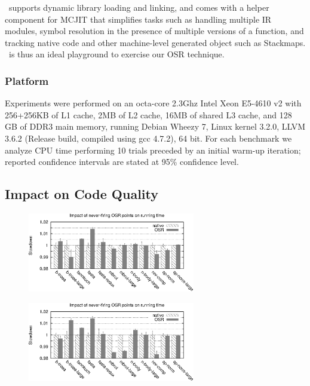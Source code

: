 \tinyvm\ supports dynamic library loading and linking, and comes with a helper component for MCJIT that simplifies tasks such as handling multiple IR modules, symbol resolution in the presence of multiple versions of a function, and tracking native code and other machine-level generated object such as Stackmaps. \tinyvm\ is thus an ideal playground to exercise our OSR technique.

\subsubsection*{Platform}
Experiments were performed on an octa-core 2.3Ghz Intel Xeon E5-4610 v2 with 256+256KB of L1 cache, 2MB of L2 cache, 16MB of shared L3 cache, and 128 GB of DDR3 main memory, running Debian Wheezy 7, Linux kernel 3.2.0, LLVM 3.6.2 (Release build, compiled using gcc 4.7.2), 64 bit. For each benchmark we analyze CPU time performing 10 trials preceded by an initial warm-up iteration; reported confidence intervals are stated at 95\% confidence level.

\subsection{Impact on Code Quality}

\ifdefined\noauthorea
\begin{figure}[!ht]
\begin{center}
\includegraphics[width=0.65\textwidth]{figures/osr-code-quality-base/osr-code-quality-base.eps}
\caption{\protect}
\end{center}
\end{figure}
\fi

\ifdefined\noauthorea
\begin{figure}[ht]
\begin{center}
\includegraphics[width=0.65\textwidth]{figures/osr-code-quality-O1/osr-code-quality-O1.eps}
\caption{\protect}
\end{center}
\end{figure}
\fi

